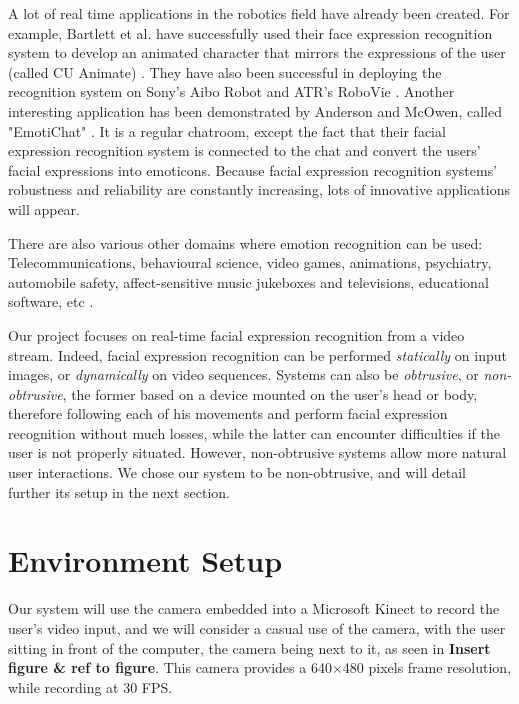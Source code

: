 \noindent A lot of real time applications in the robotics field have already been created. For example, Bartlett et al. have successfully used their face expression recognition system to develop an animated character that mirrors the expressions of the user (called CU Animate) \cite{BAR03}. They have also been successful in deploying the recognition system on Sony's Aibo Robot and ATR's RoboVie \cite{BAR03}. Another interesting application has been demonstrated by Anderson and McOwen, called "EmotiChat" \cite{AND06}. It is a regular chatroom, except the fact that their facial expression recognition system is connected to the chat and convert the users' facial expressions into emoticons. Because facial expression recognition systems' robustness and reliability are constantly increasing, lots of innovative applications will appear.
\newline

\noindent There are also various other domains where emotion recognition can be used: Telecommunications, behavioural science, video games, animations, psychiatry, automobile safety, affect-sensitive music jukeboxes and televisions, educational software, etc \cite{BET12}.
\newline

\noindent Our project focuses on real-time facial expression recognition from a video stream. Indeed, facial expression recognition can be performed \textit{statically} on input images, or \textit{dynamically} on video sequences. Systems can also be \textit{obtrusive}, or \textit{non-obtrusive}, the former based on a device mounted on the user's head or body, therefore following each of his movements and perform facial expression recognition without much losses, while the latter can encounter difficulties if the user is not properly situated. However, non-obtrusive systems allow more natural user interactions. We chose our system to be non-obtrusive, and will detail further its setup in the next section.
\newline

\section{Environment Setup}

\vspace{\baselineskip}
\noindent Our system will use the camera embedded into a Microsoft Kinect to record the user's video input, and we will consider a casual use of the camera, with the user sitting in front of the computer, the camera being next to it, as seen in \textbf{\color{red} Insert figure \& ref to figure}. This camera provides a 640$\times$480 pixels frame resolution, while recording at 30 FPS.
\newline

